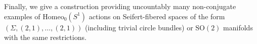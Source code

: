 \documentclass[10pt, oneside]{article}
\newcommand{\SO}[1][2]{\text{SO}(#1)}
\newcommand{\homeo}[1][S^1]{\text{Homeo}_0(#1)}
\theoremstyle{definition}
\newtheorem{rem}{Remark}[section]
\theoremstyle{definition}
\begin{document}

Finally, we give a construction providing uncountably many non-conjugate examples of $\homeo$ actions on Seifert-fibered spaces of the form $(\Sigma, (2, 1), \dots, (2, 1))$ (including trivial circle bundles) or $\SO$ manifolds with the same restrictions.

\end{document}
